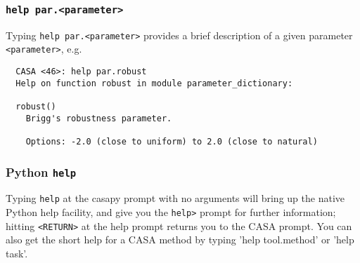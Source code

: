 \subsubsection{{\tt help par.<parameter>}}
\label{section:intro.basics.help.par}

Typing {\tt help par.<parameter>} provides a brief description of a 
given parameter {\tt <parameter>}, e.g.
\small
\begin{verbatim}
  CASA <46>: help par.robust
  Help on function robust in module parameter_dictionary:

  robust()
    Brigg's robustness parameter.

    Options: -2.0 (close to uniform) to 2.0 (close to natural)
\end{verbatim}
\normalsize

\subsubsection{Python {\tt help}}
\label{section:intro.basics.help.py}

Typing {\tt help} at the casapy prompt with no arguments will bring
up the native Python help facility, and give you the
{\tt help>} prompt for further information; hitting {\tt <RETURN>} at the help
prompt returns you to the CASA prompt.  You can also get the short
help for a CASA method by typing 'help tool.method' or 'help task'.

